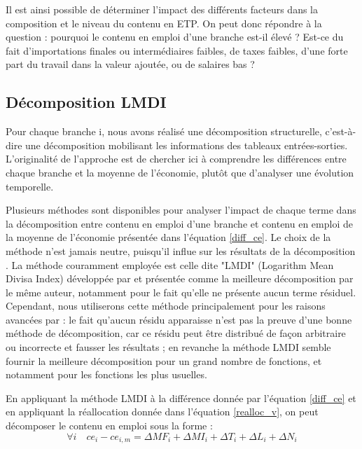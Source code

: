 Il est ainsi possible de déterminer l’impact des différents facteurs dans la composition et le niveau du contenu en ETP. On peut donc répondre à la question : pourquoi le contenu en emploi d’une branche est-il élevé ? Est-ce du fait d’importations finales ou intermédiaires faibles, de taxes faibles, d’une forte part du travail dans la valeur ajoutée, ou de salaires bas ?

\cleardoublepage

\subsection{Décomposition LMDI}
\label{app:decompo_LMDI}


Pour chaque branche i, nous avons réalisé une décomposition structurelle, c'est-à-dire une décomposition mobilisant les informations des tableaux entrées-sorties. L'originalité de l'approche est de chercher ici à comprendre les différences entre chaque branche et la moyenne de l'économie, plutôt que d'analyser une évolution temporelle. 

Plusieurs méthodes sont disponibles pour analyser l'impact de chaque terme dans la décomposition entre contenu en emploi d’une branche et contenu en emploi de la moyenne de l’économie présentée dans l'équation \ref{diff_ce}. Le choix de la méthode n'est jamais neutre, puisqu'il influe sur les résultats de la décomposition \citep{Hoekstra2003}. La méthode couramment employée est celle dite "LMDI" (Logarithm Mean Divisa Index) développée par \citet{Ang2004,Ang2005} et présentée comme la meilleure décomposition par le même auteur, notamment pour le fait qu’elle ne présente aucun terme résiduel. Cependant, nous utiliserons cette méthode principalement pour les raisons avancées par \citet{Muller} : le fait qu'aucun résidu apparaisse n'est pas la preuve d'une bonne méthode de décomposition, car ce résidu peut être distribué de façon arbitraire ou incorrecte et fausser les résultats ; en revanche la méthode LMDI semble fournir la meilleure décomposition pour un grand nombre de fonctions, et notamment pour les fonctions les plus usuelles.

En appliquant la méthode LMDI à la différence donnée par l'équation \ref{diff_ce} et en appliquant la réallocation donnée dans l'équation \ref{realloc_v}, on peut décomposer le contenu en emploi sous la forme : 
\begin{equation*}
\forall i \quad ce_i - ce_{i,m} = \Delta MF_i + \Delta MI_i + \Delta T_i +\Delta L_i + \Delta N_i
\end{equation*}


